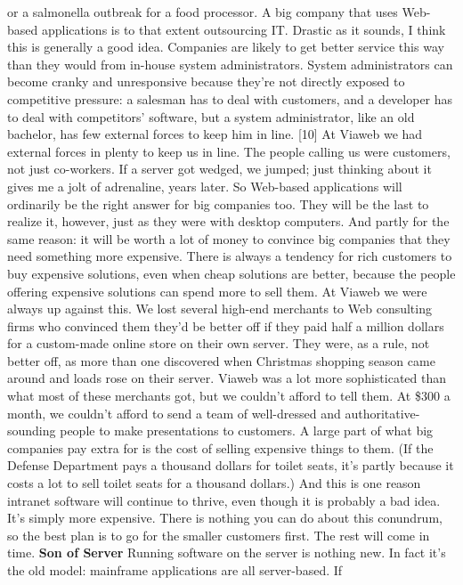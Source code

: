 or a salmonella outbreak for a food processor.
A big company that uses Web-based applications is to that extent
outsourcing IT.  Drastic as it sounds, I think this is generally
a good idea.  Companies are likely to get better service this way
than they would from in-house system administrators.  System
administrators can become cranky and unresponsive because they're
not directly exposed to competitive pressure:  a salesman has to
deal with customers, and a developer has to deal with competitors'
software, but a system administrator, like an old bachelor, has
few external forces to keep him in line. [10]  At Viaweb we had
external forces in plenty to keep us in line. The people calling
us were customers, not just co-workers.  If a server got wedged,
we jumped; just thinking about it gives me a jolt of adrenaline,
years later.
So Web-based applications will ordinarily be the right answer for
big companies too.  They will be the last to realize it, however,
just as they were with desktop computers.  And partly for the same
reason: it will be worth a lot of money to convince big companies
that they need something more expensive.
There is always a tendency for rich customers to buy expensive
solutions, even when cheap solutions are better, because the people
offering expensive solutions can spend more to sell them.  At Viaweb
we were always up against this.  We lost several high-end merchants
to Web consulting firms who convinced them they'd be better off if
they paid half a million dollars for a custom-made online store on
their own server.  They were, as a rule, not better off, as more
than one discovered when Christmas shopping season came around and
loads rose on their server.  Viaweb was a lot more sophisticated
than what most of these merchants got, but we couldn't afford to
tell them.  At \$300 a month, we couldn't afford to send a team of
well-dressed and authoritative-sounding people to make presentations
to customers.
A large part of what big companies pay extra for is the cost of
selling expensive things to them.  (If the Defense Department pays
a thousand dollars for toilet seats, it's partly because it costs
a lot to sell toilet seats for a thousand dollars.)  And this is
one reason intranet software will continue to thrive, even though
it is probably a bad idea.  It's simply more expensive.  There is
nothing you can do about this conundrum, so the best plan is to go
for the smaller customers first.  The rest will come in time.
\textbf{Son of Server}
Running software on the server is nothing new.  In fact it's the
old model: mainframe applications are all server-based.  If

